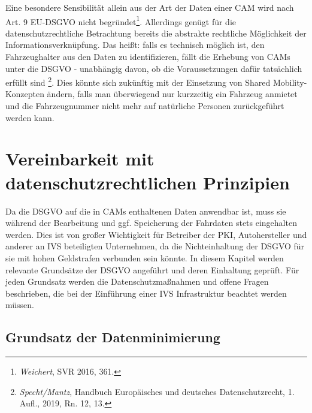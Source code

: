 Eine besondere Sensibilität allein aus der Art der Daten einer CAM wird nach Art. 9 EU-DSGVO nicht begründet\footnote{\emph{Weichert}, SVR 2016, 361.}\nocite{Weichert2016}. Allerdings genügt für die datenschutzrechtliche Betrachtung bereits die abstrakte rechtliche Möglichkeit der Informationsverknüpfung. Das heißt: falls es technisch möglich ist, den Fahrzeughalter aus den Daten zu identifizieren, fällt die Erhebung von CAMs unter die DSGVO - unabhängig davon, ob die Voraussetzungen dafür tatsächlich erfüllt sind  \footnote{\emph{Specht/Mantz}, Handbuch Europäisches und deutsches Datenschutzrecht, 1. Aufl., 2019, Rn. 12, 13.}. Dies könnte sich zukünftig mit der Einsetzung von Shared Mobility-Konzepten ändern, falls man überwiegend nur kurzzeitig ein Fahrzeug anmietet und die Fahrzeugnummer nicht mehr auf natürliche Personen zurückgeführt werden kann. 



\section{Vereinbarkeit mit datenschutzrechtlichen Prinzipien}
\label{ch:ThirdContentSection}

Da die DSGVO auf die in CAMs enthaltenen Daten anwendbar ist, muss sie während der Bearbeitung und ggf. Speicherung der Fahrdaten stets eingehalten werden. Dies ist von großer Wichtigkeit für Betreiber der PKI, Autohersteller und anderer an IVS beteiligten Unternehmen, da die Nichteinhaltung der DSGVO für sie mit hohen Geldstrafen verbunden sein könnte. In diesem Kapitel werden relevante Grundsätze der DSGVO angeführt und deren Einhaltung geprüft. Für jeden Grundsatz werden die Datenschutzmaßnahmen und offene Fragen beschrieben, die bei der Einführung einer IVS Infrastruktur beachtet werden müssen. 

\subsection{Grundsatz der Datenminimierung}

